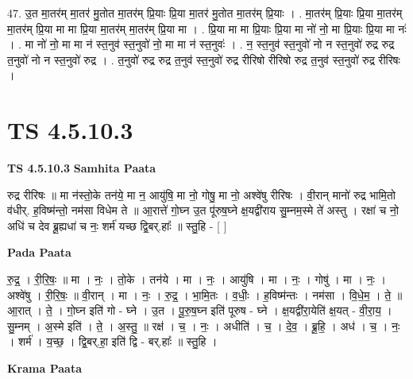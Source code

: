 \documentclass[17pt]{extarticle}
\begin{document}
47. उ॒त मा॒तर॑म् मा॒तर॑ मु॒तोत मा॒तर॑म् प्रि॒याः प्रि॒या मा॒तर॑ मु॒तोत मा॒तर॑म् प्रि॒याः । . मा॒तर॑म् प्रि॒याः प्रि॒या मा॒तर॑म् मा॒तर॑म् प्रि॒या मा मा प्रि॒या मा॒तर॑म् मा॒तर॑म् प्रि॒या मा । . प्रि॒या मा मा प्रि॒याः प्रि॒या मा नो॑ नो॒ मा प्रि॒याः प्रि॒या मा नः॑ । . मा नो॑ नो॒ मा मा न॑ स्त॒नुव॑ स्त॒नुवो॑ नो॒ मा मा न॑ स्त॒नुवः॑ । . न॒ स्त॒नुव॑ स्त॒नुवो॑ नो न स्त॒नुवो॑ रुद्र रुद्र त॒नुवो॑ नो न स्त॒नुवो॑ रुद्र । . त॒नुवो॑ रुद्र रुद्र त॒नुव॑ स्त॒नुवो॑ रुद्र रीरिषो रीरिषो रुद्र त॒नुव॑ स्त॒नुवो॑ रुद्र रीरिषः । \newline
\pagebreak
{}

\section{ TS 4.5.10.3 }

\textbf{TS 4.5.10.3 } \newline
\textbf{Samhita Paata} \newline

रुद्र रीरिषः ॥ मा न॑स्तो॒के तन॑ये॒ मा न॒ आयु॑षि॒ मा नो॒ गोषु॒ मा नो॒ अश्वे॑षु रीरिषः । वी॒रान् मानो॑ रुद्र भामि॒तो व॑धीर्. ह॒विष्म॑न्तो॒ नम॑सा विधेम ते ॥ आ॒रात्ते॑ गो॒घ्न उ॒त पू॑रुष॒घ्ने क्ष॒यद्वी॑राय सु॒म्नम॒स्मे ते॑ अस्तु । रक्षा॑ च नो॒ अधि॑ च देव ब्रू॒ह्यधा॑ च नः॒ शर्म॑ यच्छ द्वि॒बर्.हाः᳚ ॥ स्तु॒हि - [  ] \newline

\textbf{Pada Paata} \newline

रु॒द्र॒ । री॒रि॒षः॒ ॥ मा । नः॒ । तो॒के । तन॑ये । मा । नः॒ । आयु॑षि । मा । नः॒ । गोषु॑ । मा । नः॒ । अश्वे॑षु । री॒रि॒षः॒ ॥ वी॒रान् । मा । नः॒ । रु॒द्र॒ । भा॒मि॒तः । व॒धीः॒ । ह॒विष्म॑न्तः । नम॑सा । वि॒धे॒म॒ । ते॒ ॥ आ॒रात् । ते॒ । गो॒घ्न इति॑ गो - घ्ने । उ॒त । पू॒रु॒ष॒घ्न इति॑ पूरुष - घ्ने । क्ष॒यद्वी॑रा॒येति॑ क्ष॒यत् - वी॒रा॒य॒ । सु॒म्नम् । अ॒स्मे इति॑ । ते॒ । अ॒स्तु॒ ॥ रक्ष॑ । च॒ । नः॒ । अधीति॑ । च॒ । दे॒व॒ । ब्रू॒हि॒ । अध॑ । च॒ । नः॒ । शर्म॑ । य॒च्छ॒ । द्वि॒बर्.हा॒ इति॑ द्वि - बर्.हाः᳚ ॥ स्तु॒हि ।  \newline


\textbf{Krama Paata} \newline
\end{document}
